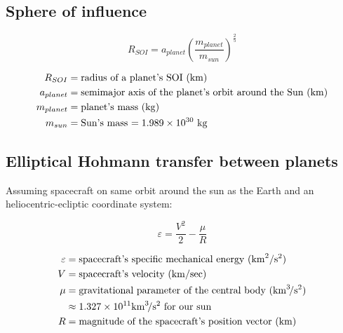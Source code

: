 \documentclass{article}
\newcommand{\myvarv}{V &= \text{spacecraft's velocity (\si{\kilo\meter\per\sec})}}
\newcommand{\myvarepsilon}{\varepsilon &= \text{spacecraft's specific mechanical energy (\si{\kilo\meter\squared\per\second\squared)}}}
\begin{document}
\subsection{Sphere of influence}
\begin{multicols}{3}
	\begin{equation*}
	\boxed{R_{SOI} = a_{planet}\left(\dfrac{m_{planet}}{m_{sun}}\right)^\frac{2}{5}}
	\end{equation*}

	\vfill\null
	\columnbreak
	\begin{align*}
	R_{SOI} &= \text{radius of a planet's SOI (\si{\kilo\meter})}\\
	a_{planet} &= \text{semimajor axis of the planet's orbit around the Sun (\si{\kilo\meter})}\\
	m_{planet} &= \text{planet's mass (\si{\kilo\gram})}\\
	m_{sun} &= \text{Sun's mass $= 1.989 \times 10^{30}$ \si{\kilo\gram}}\\
	\end{align*}
\end{multicols}

\subsection{Elliptical Hohmann transfer between planets}
Assuming spacecraft on same orbit around the sun as the Earth and an heliocentric-ecliptic coordinate system:

\begin{multicols}{3}
	\begin{equation*}
	\boxed{\varepsilon = \dfrac{V^2}{2} - \dfrac{\mu}{R}}
	\end{equation*}

	\vfill\null
	\columnbreak

	\begin{align*}
	\myvarepsilon\\
	\myvarv\\
	\mu &= \text{gravitational parameter of the central body (\si{\kilo\meter\cubed\per\second\squared})} \\
	&\approx 1.327 \times 10^{11} \si{\kilo\meter\cubed\per\second\squared} \text{ for our sun}\\
	R &= \text{magnitude of the spacecraft's position vector (\si{\kilo\meter})}\\
	\end{align*}
\end{multicols}
\end{document}
